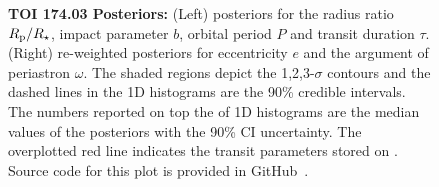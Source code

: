 \documentclass[floatfix,ApJL,twocolumn]{aastex631}
\begin{document}
\begin{figure}
    \caption{\textbf{TOI 174.03 Posteriors:} (Left) posteriors for the radius ratio $R_{\rm p}/R_\star$, impact parameter $b$, orbital period $P$ and transit duration $\tau$. (Right) re-weighted posteriors for eccentricity $e$ and the argument of periastron $\omega$. 
    The shaded regions depict the 1,2,3-$\sigma$ contours and the dashed lines in the 1D histograms are the 90\% credible intervals. 
    The numbers reported on top the of 1D histograms are the median values of the posteriors with the 90\% CI uncertainty.
    The overplotted red line indicates the transit parameters stored on \exofop. 
    Source code for this plot is provided in GitHub~\paperPlotsLink.}
    \label{fig:posteriors}
\end{figure}
\end{document}
